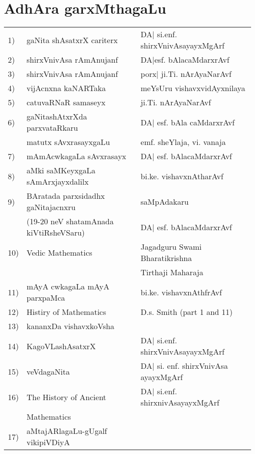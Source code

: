 \chapter{AdhAra garxMthagaLu}


\begin{tabular}{lll}
{\rm 1)} &  gaNita shAsatxrX cariterx & DA| si.enf. shirxVnivAsayayxMgArf \\
{\rm 2)} & shirxVnivAsa rAmAnujanf & DA|esf. bAlacaMdarxrAvf\\
{\rm 3)} & shirxVnivAsa rAmAnujanf & porx| ji.Ti. nArAyaNarAvf\\
{\rm 4)} & vijAcnxna kaNARTaka & meYsUru vishavxvidAyxnilaya\\
{\rm 5)} & catuvaRNaR samaseyx & ji.Ti. nArAyaNarAvf\\
{\rm 6)} & gaNitashAtxrXda parxvataRkaru & DA| esf. bAla caMdarxrAvf\\[-0.1cm]
& matutx sAvxrasayxgaLu & emf. sheYlaja, vi. vanaja\\
{\rm 7)} & mAmAcwkagaLa sAvxrasayx & DA| esf. bAlacaMdarxrAvf\\
{\rm 8)} & aMki saMKeyxgaLa sAmArxjayxdalilx & bi.ke. vishavxnAtharAvf\\
{\rm 9)} & BAratada parxsidadhx gaNitajacnxru  & saMpAdakaru \\[-0.1cm]
& ({\rm 19-20} neV shatamAnada kiVtiRsheVSaru) & DA| esf. bAlacaMdarxrAvf\\
{\rm 10)} & {\rm Vedic Mathematics} & {\rm Jagadguru Swami Bharatikrishna}\\[-0.1cm] 
&& {\rm  Tirthaji Maharaja}\\
{\rm 11)} & mAyA cwkagaLa mAyA parxpaMca & bi.ke. vishavxnAthfrAvf\\
{\rm 12)} & {\rm Histiry of Mathematics} & {\rm D.s. Smith (part 1 and 11)}\\
{\rm 13)} & kananxDa vishavxkoVsha &\\
{\rm 14)} & KagoVLashAsatxrX & DA| si.enf. shirxVnivAsayayxMgArf\\
{\rm 15)} & veVdagaNita & DA| si. enf. shirxVnivAsa ayayxMgArf\\
{\rm 16)} & {\rm The History of Ancient} & DA| si.enf. shirxnivAsayayxMgArf\\[-0.1cm]
& {\rm Mathematics}& \\
{\rm 17)} & aMtajARlagaLu-gUgalf vikipiVDiyA & \\
\end{tabular}

